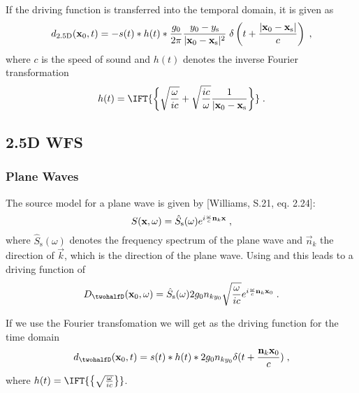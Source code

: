 \documentclass{article}
\begin{document}
If the driving function 
is transferred into the temporal domain,
it is given as
\begin{equation}
    d_{\text{2.5D}}(  \mathbf{x}  _0,t) = -s(t) * h(t) *
    \frac{g_0}{2\pi}
    \frac{y_0 - y_\text{s}}{|  \mathbf{x}  _0-  \mathbf{x}  _\text{s}|^{2}}
    \;\delta\left(t + \frac{|  \mathbf{x}  _0-  \mathbf{x}  _\text{s}|}{c}\right)
    \;,
\label{eq:d}
\end{equation}
where $c$ is the speed of sound and
$h(t)$ denotes the inverse Fourier transformation
\begin{equation} 
    h(t) =
    \IFT{\biggl\{ \sqrt{\frac{\omega}{ic}} + \sqrt{\frac{ic}{\omega}}
    \frac{1}{|\x_0-\x_\text{s}} \biggr\}} 
    \qp
    \label{eq:h}
\end{equation}


\subsection{2.5D WFS}
\label{sec:wfs25d}

\subsubsection{Plane Waves}
The source model for a plane wave is given by [Williams, S.21, eq. 2.24]:
\begin{equation} 
    S(  \mathbf{x}  ,\omega) = 
    \hat{S}_\text{s}(\omega)
    e^{i\frac{\omega}{c}  \mathbf{n} _k   \mathbf{x}  }
    \;,
\end{equation}
where $\hat{S}_\text{s}(\omega)$ denotes the frequency spectrum of the plane
wave and $\vec{n}_k$ the direction of $\vec{k}$, which is the direction of the
plane wave.
Using  and  this leads to a driving function of
\begin{equation}
    D_\twohalfD(\x_0,\omega) = \hat{S}_\text{s}(\omega)
    2 g_0 n_{ky_0} \sqrt{\frac{\omega}{ic}}
    e^{i\omegac \vec{n}_k \x_0}
    \qp
    \label{Dpw}
\end{equation}

If we use the Fourier transfomation we will get as the driving function for the
time domain
\begin{equation}
    d_\twohalfD(\x_0,t) = s(t) * h(t) * 2 g_0 n_{ky_0} \delta(t +
    \frac{\vec{n}_k \x_0}{c})
    \qc
    \label{dpw}
\end{equation}
where $h(t) = \IFT{\left\{ \sqrt{\frac{\omega}{ic}} \right\}}$.
\end{document}
